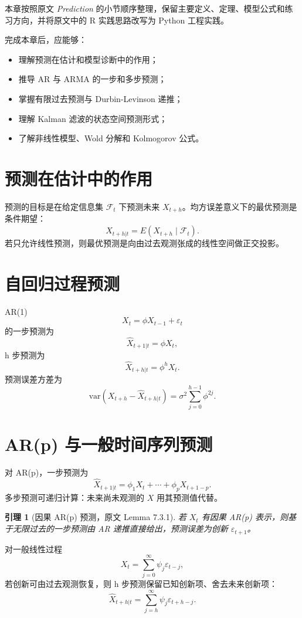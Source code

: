 \documentclass[11pt,a4paper,openany]{ctexbook}
\newtheorem{lemma}{引理}[section]
\begin{document}
本章按照原文 \textit{Prediction} 的小节顺序整理，保留主要定义、定理、模型公式和练习方向，并将原文中的 R 实践思路改写为 Python 工程实践。

完成本章后，应能够：
\begin{itemize}
  \item 理解预测在估计和模型诊断中的作用；
  \item 推导 AR 与 ARMA 的一步和多步预测；
  \item 掌握有限过去预测与 Durbin-Levinson 递推；
  \item 理解 Kalman 滤波的状态空间预测形式；
  \item 了解非线性模型、Wold 分解和 Kolmogorov 公式。
\end{itemize}

\section{预测在估计中的作用}

预测的目标是在给定信息集 \(\mathcal F_t\) 下预测未来 \(X_{t+h}\)。均方误差意义下的最优预测是条件期望：
\[
  \hat X_{t+h|t}=E(X_{t+h}\mid\mathcal F_t).
\]
若只允许线性预测，则最优预测是向由过去观测张成的线性空间做正交投影。

\section{自回归过程预测}

AR(1)
\[
  X_t=\phi X_{t-1}+\varepsilon_t
\]
的一步预测为
\[
  \hat X_{t+1|t}=\phi X_t,
\]
h 步预测为
\[
  \hat X_{t+h|t}=\phi^hX_t.
\]
预测误差方差为
\[
  \mathrm{var}(X_{t+h}-\hat X_{t+h|t})
  =\sigma^2\sum_{j=0}^{h-1}\phi^{2j}.
\]

\section{AR(p) 与一般时间序列预测}

对 AR(p)，一步预测为
\[
  \hat X_{t+1|t}=\phi_1X_t+\cdots+\phi_pX_{t+1-p}.
\]
多步预测可递归计算：未来尚未观测的 \(X\) 用其预测值代替。

\begin{lemma}[因果 AR(p) 预测，原文 Lemma 7.3.1]
若 \(X_t\) 有因果 AR(p) 表示，则基于无限过去的一步预测由 AR 递推直接给出，预测误差为创新 \(\varepsilon_{t+1}\)。
\end{lemma}

对一般线性过程
\[
  X_t=\sum_{j=0}^{\infty}\psi_j\varepsilon_{t-j},
\]
若创新可由过去观测恢复，则 h 步预测保留已知创新项、舍去未来创新项：
\[
  \hat X_{t+h|t}=\sum_{j=h}^{\infty}\psi_j\varepsilon_{t+h-j}.
\]
\end{document}
